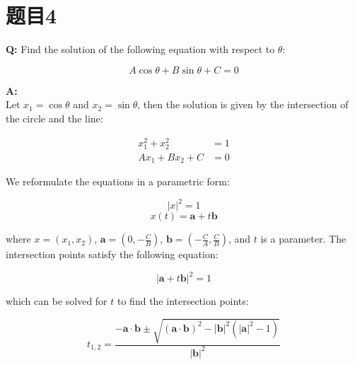 \documentclass[UTF8]{ctexart}
\begin{document}
\section*{题目4}
	\raggedright
	\textbf{Q:} Find the solution of the following equation with respect to $\theta$:
	
	\[
	A \cos \theta + B \sin \theta + C = 0
	\]
	
	\textbf{A:} \\
	Let $x_1 = \cos \theta$ and $x_2 = \sin \theta$, then the solution is given by the intersection of the circle and the line:
	

	\begin{align*}
		x_1^2 + x_2^2 &= 1 \\
		Ax_1 + Bx_2 + C &= 0
	\end{align*}
	
	We reformulate the equations in a parametric form:
	
	\[
	|x|^2 = 1
	\]
	\[
	x(t) = \mathbf{a} + t \mathbf{b}
	\]
	
	where $x = (x_1, x_2)$, $\mathbf{a} = (0, -\frac{C}{B})$, $\mathbf{b} = (-\frac{C}{A}, \frac{C}{B})$, and $t$ is a parameter. The intersection points satisfy the following equation:
	
	\[
	|\mathbf{a} + t \mathbf{b}|^2 = 1
	\]
	
	which can be solved for $t$ to find the intersection points:
	
	\[
	t_{1,2} = \frac{-\mathbf{a} \cdot \mathbf{b} \pm \sqrt{(\mathbf{a} \cdot \mathbf{b})^2 - |\mathbf{b}|^2 (|\mathbf{a}|^2 - 1)}}{|\mathbf{b}|^2}
	\]
	
\end{document}
